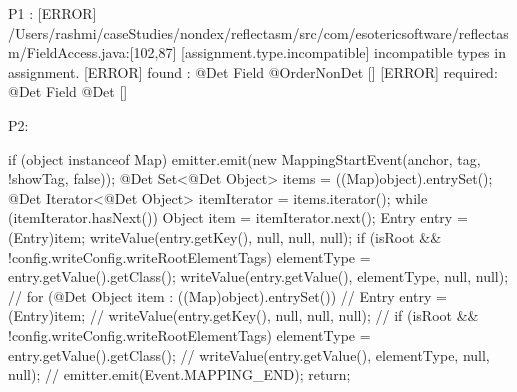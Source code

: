 P1 :
[ERROR] /Users/rashmi/caseStudies/nondex/reflectasm/src/com/esotericsoftware/reflectasm/FieldAccess.java:[102,87] [assignment.type.incompatible] incompatible types in assignment.
[ERROR]   found   : @Det Field @OrderNonDet []
[ERROR]   required: @Det Field @Det []

P2:

		if (object instanceof Map) {
    emitter.emit(new MappingStartEvent(anchor, tag, !showTag, false));
    @Det Set<@Det Object> items = ((Map)object).entrySet();
    @Det Iterator<@Det Object> itemIterator = items.iterator();
    while (itemIterator.hasNext()) {
        Object item = itemIterator.next();
        Entry entry = (Entry)item;
        writeValue(entry.getKey(), null, null, null);
        if (isRoot && !config.writeConfig.writeRootElementTags) elementType = entry.getValue().getClass();
        writeValue(entry.getValue(), elementType, null, null);
    }
    //			for (@Det Object item : ((Map)object).entrySet()) {
        //				Entry entry = (Entry)item;
        //				writeValue(entry.getKey(), null, null, null);
        //				if (isRoot && !config.writeConfig.writeRootElementTags) elementType = entry.getValue().getClass();
        //				writeValue(entry.getValue(), elementType, null, null);
        //			}
    emitter.emit(Event.MAPPING_END);
    return;
}

